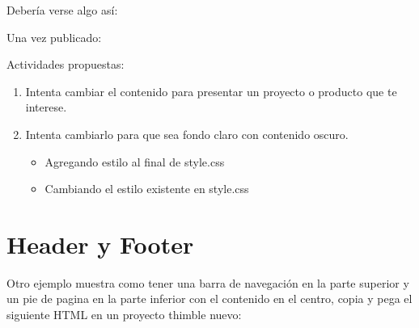 \documentclass[letterpaper,10pt,spanish]{sphinxmanual}
\begin{document}
\begin{sphinxVerbatim}[commandchars=\\\{\}]
 
    
  
    
   


 
      
\end{sphinxVerbatim}

Debería verse algo así:

\begin{figure}[htbp]
\centering

\noindent{}
\end{figure}

Una vez publicado:

\begin{figure}[htbp]
\centering

\noindent{}
\end{figure}

Actividades propuestas:
\begin{enumerate}
\item {} 
Intenta cambiar el contenido para presentar un proyecto o producto que te interese.

\item {} 
Intenta cambiarlo para que sea fondo claro con contenido oscuro.
\begin{itemize}
\item {} 
Agregando estilo al final de style.css

\item {} 
Cambiando el estilo existente en style.css

\end{itemize}

\end{enumerate}


\section{Header y Footer}
\label{\detokenize{reusando-html-de-otros:header-y-footer}}
Otro ejemplo muestra como tener una barra de navegación en la parte superior y
un pie de pagina en la parte inferior con el contenido en el centro, copia y
pega el siguiente HTML en un proyecto thimble nuevo:
\end{document}
